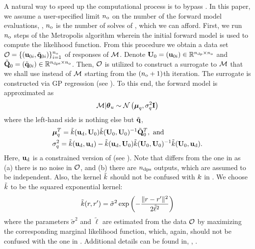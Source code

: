 A natural way to speed up the computational process is to bypass . In this paper, we assume a user-specified limit ${n_\text{o}}$ on the number of the forward model evaluations, \ie, ${n_\text{o}}$ is the number of solves of , which we can afford. First, we run ${n_\text{o}}$ steps of the Metropolis algorithm wherein the initial forward model is used to compute the likelihood function. From this procedure we obtain a data set $\mathcal{O} = \{ (\mathbf{u}_{0i}, \tilde{\mathbf{q}}_{0i}) \}_{i = 1}^{n_\text{o}}$ of responses of $\model$. Denote $\mathbf{U}_0 = (\mathbf{u}_{0i}) \in \mathbb{R}^{{n_\text{dp}} \times {n_\text{o}}}$ and $\tilde{\mathbf{Q}}_0 = (\tilde{\mathbf{q}}_{0i}) \in \mathbb{R}^{{n_\text{dps}} \times {n_\text{o}}}$. Then, $\mathcal{O}$ is utilized to construct a surrogate to $\model$ that we shall use instead of $\model$ starting from the $({n_\text{o}} + 1)$th iteration. The surrogate is constructed via GP regression (see ). To this end, the forward model is approximated as
\begin{equation} \elabel{gp-approximation}
  \model | \vparam_\u \sim \gaussian{\vmean_\T}{\sigma^2_\T \mI}
\end{equation}
where the left-hand side is nothing else but $\tilde{\mathbf{q}}$,
\begin{align}
  & \vmean_\T^T = \tilde{\fCov}(\vu_\data, \mU_0) \tilde{\fCov}(\mU_0, \mU_0)^{-1} \mmT_0^T, \text{ and} \elabel{gp-mean} \\
  & \sigma^2_\T = \tilde{\fCov}(\vu_\data, \vu_\data) - \tilde{\fCov}(\vu_\data, \mU_0) \tilde{\fCov}(\mU_0, \mU_0)^{-1} \tilde{\fCov}(\mU_0, \vu_\data). \elabel{gp-variance}
\end{align}
Here, $\mathbf{u}_{\text{d}}$ is a constrained version of  (see ). Note that  differs from the one in  as (a) there is no noise in $\mathcal{O}$, and (b) there are ${n_\text{dps}}$ outputs, which are assumed to be independent. Also, the kernel $\tilde{\fCov}$ should not be confused with $\fCov$ in . We choose $\tilde{\fCov}$ to be the squared exponential kernel:
\[
  \tilde{\fCov}(\r, \r') = \tilde{\sigma}^2 \exp\left(-\frac{\norm{\r - \r'}^2}{2 \tilde{\ell}^2}\right)
\]
where the parameters $\tilde{\sigma}^2$ and $\tilde{\ell}$ are estimated from the data $\mathcal{O}$ by maximizing the corresponding marginal likelihood function, which, again, should not be confused with the one in . Additional details can be found in, \eg, \cite{mackay2003, rasmussen2006}.

